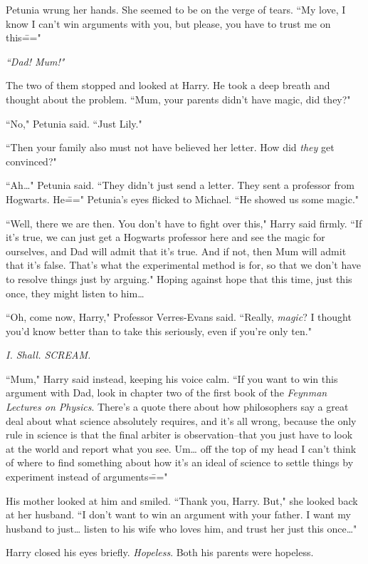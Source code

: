 Petunia wrung her hands. She seemed to be on the verge of tears. ``My love, I know I can't win arguments with you, but please, you have to trust me on this\==="

\emph{``Dad! Mum!"}

The two of them stopped and looked at Harry. He took a deep breath and thought about the problem. ``Mum, your parents didn't have magic, did they?"

``No," Petunia said. ``Just Lily."

``Then your family also must not have believed her letter. How did \emph{they} get convinced?"

``Ah{\ldots}" Petunia said. ``They didn't just send a letter. They sent a professor from Hogwarts. He\===" Petunia's eyes flicked to Michael. ``He showed us some magic."

``Well, there we are then. You don't have to fight over this," Harry said firmly. ``If it's true, we can just get a Hogwarts professor here and see the magic for ourselves, and Dad will admit that it's true. And if not, then Mum will admit that it's false. That's what the experimental method is for, so that we don't have to resolve things just by arguing." Hoping against hope that this time, just this once, they might listen to him{\ldots}

``Oh, come now, Harry," Professor Verres-Evans said. ``Really, \emph{magic}? I thought you'd know better than to take this seriously, even if you're only ten."

\emph{I. Shall. SCREAM.}

``Mum," Harry said instead, keeping his voice calm. ``If you want to win this argument with Dad, look in chapter two of the first book of the \emph{Feynman Lectures on Physics}. There's a quote there about how philosophers say a great deal about what science absolutely requires, and it's all wrong, because the only rule in science is that the final arbiter is observation\---that you just have to look at the world and report what you see. Um{\ldots} off the top of my head I can't think of where to find something about how it's an ideal of science to settle things by experiment instead of arguments\==="

His mother looked at him and smiled. ``Thank you, Harry. But," she looked back at her husband. ``I don't want to win an argument with your father. I want my husband to just{\ldots} listen to his wife who loves him, and trust her just this once{\ldots}"

Harry closed his eyes briefly. \emph{Hopeless}. Both his parents were hopeless.

